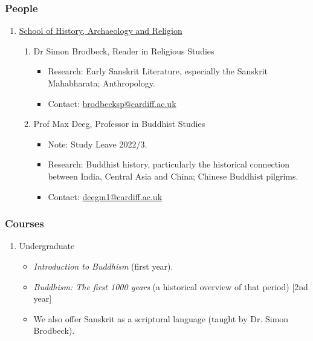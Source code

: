 \documentclass[a4paper,10.5pt]{article}
\begin{document}
\subsubsection{People}
\label{sec:org7c8f115}
\begin{enumerate}
\item \href{https://www.cardiff.ac.uk/history-archaeology-religion}{School of History, Archaeology and Religion}
\label{sec:org85be446}
\begin{enumerate}
\item Dr Simon Brodbeck, Reader in Religious Studies
\label{sec:org753f6f1}
\begin{itemize}
\item Research: Early Sanskrit Literature, especially the Sanskrit Mahabharata; Anthropology.\\
\item Contact: \href{mailto:brodbecksp@cardiff.ac.uk}{brodbecksp@cardiff.ac.uk}\\
\end{itemize}
\item Prof Max Deeg, Professor in Buddhist Studies
\label{sec:org3da6ec4}
\begin{itemize}
\item Note: Study Leave 2022/3.\\
\item Research: Buddhist history, particularly the historical connection between India, Central Asia and China; Chinese Buddhist pilgrims.\\
\item Contact: \href{mailto:deegm1@cardiff.ac.uk}{deegm1@cardiff.ac.uk}\\
\end{itemize}
\end{enumerate}
\end{enumerate}
\subsubsection{Courses}
\label{sec:org7e4390d}
\begin{enumerate}
\item Undergraduate
\label{sec:org44061f4}
\begin{itemize}
\item \emph{Introduction to Buddhism} (first year).\\
\item \emph{Buddhism: The first 1000 years} (a historical overview of that period) [2nd year]\\
\item We also offer Sanskrit as a scriptural language (taught by Dr. Simon Brodbeck).\\
\end{itemize}
\end{enumerate}
\end{document}
